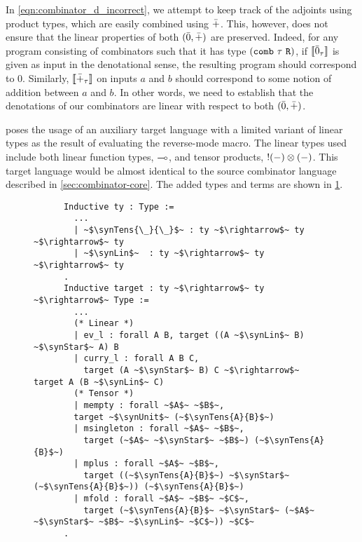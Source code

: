   In \cref{eqn:combinator_d_incorrect}, we attempt to keep track of the adjoints using product types, which are easily combined using $\bar{+}$.
  This, however, does not ensure that the linear properties of both $(\bar{0}, \bar{+})$ are preserved.
  Indeed, for any program consisting of combinators such that it has type $(\texttt{comb}\ \tau\ \texttt{R})$, if $\llbracket \bar{0}_\tau \rrbracket$ is given as input in the denotational sense, the resulting program should correspond to $0$.
  Similarly, $\llbracket \bar{+}_\tau \rrbracket$ on inputs $a$ and $b$ should correspond to some notion of addition between $a$ and $b$.
  In other words, we need to establish that the denotations of our combinators are linear with respect to both $(\bar{0}, \bar{+})$.

  \Vakar{} poses the usage of an auxiliary target language with a limited variant of linear types as the result of evaluating the reverse-mode macro\cite{vkr2020reverse}.
  The linear types used include both linear function types, $\multimap$, and tensor products, $!(-)\otimes(-)$.
  This target language would be almost identical to the source combinator language described in \cref{sec:combinator-core}.
  The added types and terms are shown in \cref{fig:combinator_linear}.


  \begin{figure}
    \centering
    \begin{verbatim}
      Inductive ty : Type :=
        ...
        | ~$\synTens{\_}{\_}$~ : ty ~$\rightarrow$~ ty ~$\rightarrow$~ ty
        | ~$\synLin$~  : ty ~$\rightarrow$~ ty ~$\rightarrow$~ ty
      .
      Inductive target : ty ~$\rightarrow$~ ty ~$\rightarrow$~ Type :=
        ...
        (* Linear *)
        | ev_l : forall A B, target ((A ~$\synLin$~ B) ~$\synStar$~ A) B
        | curry_l : forall A B C,
          target (A ~$\synStar$~ B) C ~$\rightarrow$~ target A (B ~$\synLin$~ C)
        (* Tensor *)
        | mempty : forall ~$A$~ ~$B$~,
        target ~$\synUnit$~ (~$\synTens{A}{B}$~)
        | msingleton : forall ~$A$~ ~$B$~,
          target (~$A$~ ~$\synStar$~ ~$B$~) (~$\synTens{A}{B}$~)
        | mplus : forall ~$A$~ ~$B$~,
          target ((~$\synTens{A}{B}$~) ~$\synStar$~ (~$\synTens{A}{B}$~)) (~$\synTens{A}{B}$~)
        | mfold : forall ~$A$~ ~$B$~ ~$C$~,
          target (~$\synTens{A}{B}$~ ~$\synStar$~ (~$A$~ ~$\synStar$~ ~$B$~ ~$\synLin$~ ~$C$~)) ~$C$~
      .
    \end{verbatim}
    \caption{}
    \label{fig:combinator_linear}
  \end{figure}

